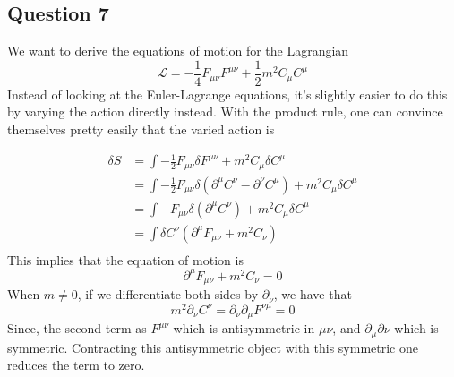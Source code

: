 \subsection{Question 7} 
We want to derive the equations of motion for the Lagrangian \[ 
\mathcal{L} =  - \frac{1}{4} F_{ \mu \nu}F^{ \mu\nu} + \frac{1}{2} m^2 C_\mu C^\mu 
\] 
Instead of looking at the Euler-Lagrange equations, it's slightly easier to do this by varying the action directly instead. With the product rule, one can convince themselves pretty easily that the varied action is 

\begin{align*} 
\delta S &  = \int - \frac{1}{2} F_{ \mu \nu} \delta F^{ \mu \nu}  + m^2 C_\mu \delta C^\mu \\ 
& = \int  - \frac{1}{2} F_{\mu \nu} \delta \left( \partial^\mu C^\nu - \partial^\nu C^\mu \right)  + m^2 C_\mu \delta C^\mu  \\ 
& = \int   - F_{ \mu \nu} \delta \left( \partial^\mu C^\nu \right)  + m^2 C_\mu \delta C^\mu  \\ 
&= \int  \delta C^\nu \left( \partial^\mu F_{ \mu \nu} + m^2 C_\nu \right) \\ 
\end{align*} 
This implies that the equation of motion is 
\[\partial^\mu  F_{ \mu \nu} + m^2 C_\nu = 0  \]
When $m \neq 0$, if we differentiate both sides by $\partial_\nu$, we have that 
\[ 
m^2 \partial_\nu C^\nu  = \partial_\nu \partial_\mu F^{ \nu\mu} = 0 
\] 
Since, the second term as $F^{ \mu\nu }$ which is antisymmetric in $\mu \nu$, and $\partial_\mu \partial\nu$ which is symmetric. Contracting this antisymmetric object with this symmetric one reduces the term to zero. 

